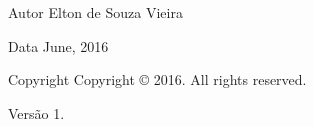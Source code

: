 \begin{DoxyAuthor}{Autor}
Elton de Souza Vieira 
\end{DoxyAuthor}
\begin{DoxyDate}{Data}
June, 2016 
\end{DoxyDate}
\begin{DoxyCopyright}{Copyright}
Copyright \copyright{} 2016. All rights reserved. 
\end{DoxyCopyright}
\begin{DoxyVersion}{Versão}
1. 
\end{DoxyVersion}
